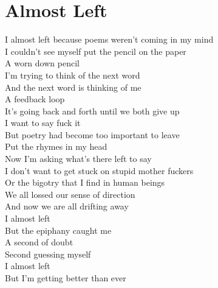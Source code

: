 \documentclass[12pt, b5paper, oneside]{book}
\begin{document}
\section{Almost Left}
I almost left because poems weren't coming in my mind
\\I couldn't see myself put the pencil on the paper
\\A worn down pencil
\\I'm trying to think of the next word
\\And the next word is thinking of me
\\A feedback loop
\\It's going back and forth until we both give up
\\I want to say fuck it
\\But poetry had become too important to leave
\\Put the rhymes in my head
\\Now I'm asking what's there left to say
\\I don't want to get stuck on stupid mother fuckers
\\Or the bigotry that I find in human beings
\\We all lossed our sense of direction
\\And now we are all drifting away
\\I almost left
\\But the epiphany caught me
\\A second of doubt
\\Second guessing myself
\\I almost left
\\But I'm getting better than ever 
\newpage
\end{document}
